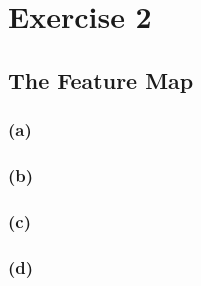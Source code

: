 \documentclass{article}
\begin{document}
\section*{Exercise 2}

\subsection*{The Feature Map}

\subsubsection*{(a)}

\subsubsection*{(b)}

\subsubsection*{(c)}

\subsubsection*{(d)}
\end{document}
